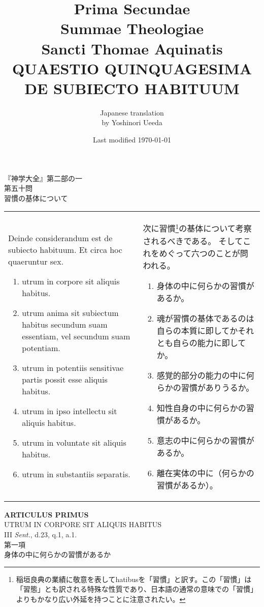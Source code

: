 \documentclass[10pt]{jsarticle} %
\title{{\bf Prima Secundae}\\{\HUGE Summae Theologiae}\\Sancti Thomae
Aquinatis\\{\sffamily QUAESTIO QUINQUAGESIMA}\\{\bf DE SUBIECTO HABITUUM}}
\author{Japanese translation\\by Yoshinori {\sc Ueeda}}
\date{Last modified \today}
\begin{document}
\maketitle
\thispagestyle{empty}
\begin{center}
{\Large 『神学大全』第二部の一\\第五十問\\習慣の基体について}
\end{center}


\begin{longtable}{p{21em}p{21em}}

Deinde considerandum est de subiecto habituum. Et circa hoc quaeruntur
sex. 

\begin{enumerate}
 \item utrum in corpore sit aliquis habitus.
 \item utrum anima sit subiectum habitus secundum suam essentiam, vel secundum suam potentiam.
 \item utrum in potentiis sensitivae partis possit esse aliquis habitus.
 \item utrum in ipso intellectu sit aliquis habitus.
 \item utrum in voluntate sit aliquis habitus.
 \item utrum in substantiis separatis.
\end{enumerate}

&

次に習慣\footnote{稲垣良典の業績に敬意を表してhatibusを「習慣」と訳す。この「習慣」は「習態」とも訳される特殊な性質であり、日本語の通常の意味での「習慣」よりもかなり広い外延を持つことに注意されたい。}の基体について考察されるべきである。
そしてこれをめぐって六つのことが問われる。
\begin{enumerate}
 \item 身体の中に何らかの習慣があるか。
 \item 魂が習慣の基体であるのは自らの本質に即してかそれとも自らの能力に即してか。
 \item 感覚的部分の能力の中に何らかの習慣がありうるか。
 \item 知性自身の中に何らかの習慣があるか。
 \item 意志の中に何らかの習慣があるか。
 \item 離在実体の中に（何らかの習慣があるか）。
\end{enumerate}

\end{longtable}
\newpage
{}
\begin{center}
{\Large {\bf ARTICULUS PRIMUS}}\\
{\large UTRUM IN CORPORE SIT ALIQUIS HABITUS}\\
{\footnotesize III {\itshape Sent.}, d.23, q.1, a.1.}\\
{\Large 第一項\\身体の中に何らかの習慣があるか}
\end{center}
\end{document}
